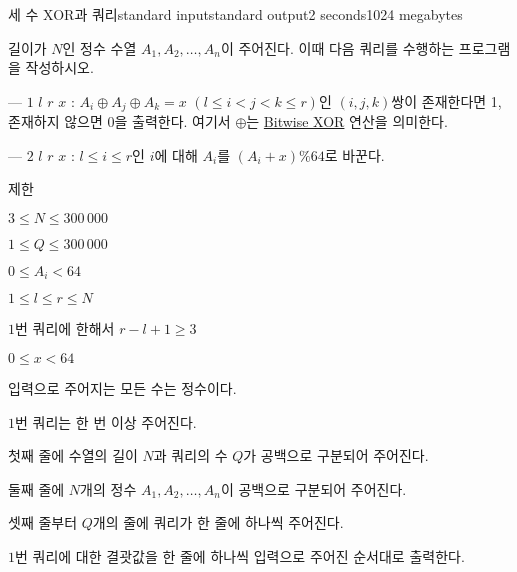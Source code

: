 \begin{problem}{세 수 XOR과 쿼리}{standard input}{standard output}{2 seconds}{1024 megabytes}

길이가 $N$인 정수 수열 $A_1,A_2,\dots,A_n$이 주어진다. 이때 다음 쿼리를 수행하는 프로그램을 작성하시오.

--- $1$ $l$ $r$ $x$ : $A_i \oplus A_j \oplus A_k = x$ $(l \le i < j < k \le r)$인 $(i,j,k)$쌍이 존재한다면 1, 존재하지 않으면 0을 출력한다. 여기서  $\oplus$는 \href{https://en.wikipedia.org/wiki/Bitwise_operation#XOR}{Bitwise XOR} 연산을 의미한다.

--- $2$ $l$ $r$ $x$ : $l \le i \le r$인 $i$에 대해 $A_i$를 $(A_i+x)\%64$로 바꾼다.

제한

$3 \le N \le 300\,000$

$1 \le Q \le 300\,000$

$0 \le A_i < 64$

$1 \le l \le r \le N$

$1$번 쿼리에 한해서 $r-l+1 \ge 3$

$0 \le x < 64$

입력으로 주어지는 모든 수는 정수이다.

$1$번 쿼리는 한 번 이상 주어진다.

\InputFile
첫째 줄에 수열의 길이 $N$과 쿼리의 수 $Q$가 공백으로 구분되어 주어진다. 

둘째 줄에 $N$개의 정수 $A_1,A_2,\dots,A_n$이 공백으로 구분되어 주어진다. 

셋째 줄부터 $Q$개의 줄에 쿼리가 한 줄에 하나씩 주어진다.

\OutputFile
$1$번 쿼리에 대한 결괏값을 한 줄에 하나씩 입력으로 주어진 순서대로 출력한다.

\Example

\begin{example}
%
\end{example}

\end{problem}

